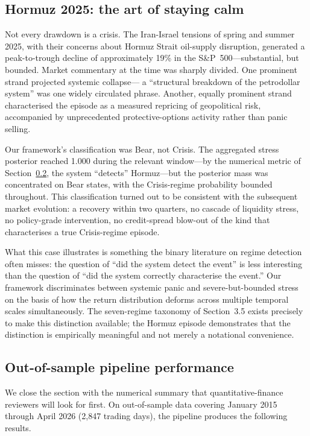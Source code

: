 \documentclass[11pt]{article}
\begin{document}
\subsection{Hormuz 2025: the art of staying calm}
\label{sec:hormuz}

Not every drawdown is a crisis. The Iran-Israel tensions of spring and
summer 2025, with their concerns about Hormuz Strait oil-supply
disruption, generated a peak-to-trough decline of approximately 19\% in
the S\&P~500---substantial, but bounded. Market commentary at the time
was sharply divided. One prominent strand projected systemic collapse---
a ``structural breakdown of the petrodollar system'' was one widely
circulated phrase. Another, equally prominent strand characterised the
episode as a measured repricing of geopolitical risk, accompanied by
unprecedented protective-options activity rather than panic selling.

Our framework's classification was Bear, not Crisis. The aggregated
stress posterior reached 1.000 during the relevant window---by the
numerical metric of Section~\ref{sec:oos}, the system ``detects''
Hormuz---but the posterior mass was concentrated on Bear states, with
the Crisis-regime probability bounded throughout. This classification
turned out to be consistent with the subsequent market evolution: a
recovery within two quarters, no cascade of liquidity stress, no
policy-grade intervention, no credit-spread blow-out of the kind that
characterises a true Crisis-regime episode.

What this case illustrates is something the binary literature on regime
detection often misses: the question of ``did the system detect the
event'' is less interesting than the question of ``did the system
correctly characterise the event.'' Our framework discriminates between
systemic panic and severe-but-bounded stress on the basis of how the
return distribution deforms across multiple temporal scales
simultaneously. The seven-regime taxonomy of Section~3.5 exists
precisely to make this distinction available; the Hormuz episode
demonstrates that the distinction is empirically meaningful and not
merely a notational convenience.

\subsection{Out-of-sample pipeline performance}
\label{sec:oos}

We close the section with the numerical summary that
quantitative-finance reviewers will look for first. On out-of-sample
data covering January 2015 through April 2026 (2{,}847 trading days),
the pipeline produces the following results.
\end{document}
